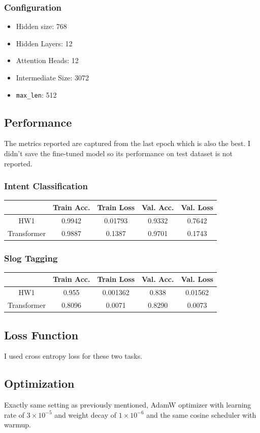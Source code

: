 \documentclass{homeworg}
\begin{document}
\subsubsection{Configuration}
\begin{itemize}
    \item Hidden size: 768
    \item Hidden Layers: 12
    \item Attention Heads: 12
    \item Intermediate Size: 3072
    \item \texttt{max\_len}: 512
\end{itemize}
\subsection{Performance}
The metrics reported are captured from the last epoch which is also the best. I didn't save the fine-tuned model so its performance on test dataset is not reported.
\subsubsection{Intent Classification}
\begin{tabular}{c|c|c|c|c}
    & Train Acc.  & Train Loss & Val. Acc.  & Val. Loss \\ \hline
    HW1 & 0.9942 & 0.01793 & 0.9332 & 0.7642 \\ 
    \hline  Transformer & 0.9887 & 0.1387 &  0.9701 & 0.1743
\end{tabular}
\subsubsection{Slog Tagging}
\begin{tabular}{c|c|c|c|c}
    & Train Acc.  & Train Loss & Val. Acc.  & Val. Loss \\ \hline
    HW1 & 0.955 & 0.001362 & 0.838 & 0.01562
     \\ 
    \hline  Transformer & 0.8096 & 0.0071 & 0.8290 & 0.0073
\end{tabular}
\subsection{Loss Function}
I used cross entropy loss for these two tasks.
\subsection{Optimization}
Exactly same setting as previously mentioned, AdamW optimizer with learning rate of $3\times 10^{-5}$ and weight decay of $1\times 10^{-6}$ and the same cosine scheduler with warmup.
\end{document}
